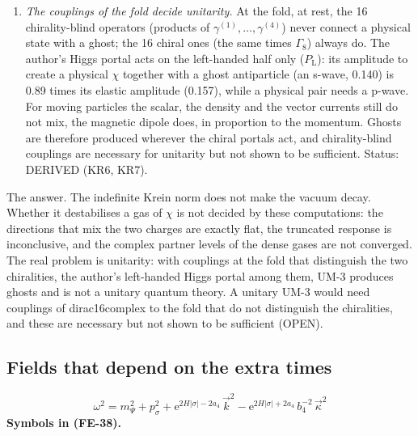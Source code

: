 \documentclass[
  10pt,
]{article}
\begin{document}
\begin{enumerate}
  so whether dense gases of \(\chi\) grow away from their state is not
  established; the dark matter of today is dilute by many orders of
  magnitude. Status: DERIVED (KR5), OPEN (the convergence).
\item
  \emph{The couplings of the fold decide unitarity.} At the fold, at
  rest, the 16 chirality-blind operators (products of
  \(\gamma^{(1)}, \dots, \gamma^{(4)}\)) never connect a physical state
  with a ghost; the 16 chiral ones (the same times \(\Gamma_8\)) always
  do. The author's Higgs portal acts on the left-handed half only
  (\(P_{\mathrm{L}}\)): its amplitude to create a physical \(\chi\)
  together with a ghost antiparticle (an s-wave, 0.140) is 0.89 times
  its elastic amplitude (0.157), while a physical pair needs a p-wave.
  For moving particles the scalar, the density and the vector currents
  still do not mix, the magnetic dipole does, in proportion to the
  momentum. Ghosts are therefore produced wherever the chiral portals
  act, and chirality-blind couplings are necessary for unitarity but not
  shown to be sufficient. Status: DERIVED (KR6, KR7).
\end{enumerate}

The answer. The indefinite Krein norm does not make the vacuum decay.
Whether it destabilises a gas of \(\chi\) is not decided by these
computations: the directions that mix the two charges are exactly flat,
the truncated response is inconclusive, and the complex partner levels
of the dense gases are not converged. The real problem is unitarity:
with couplings at the fold that distinguish the two chiralities, the
author's left-handed Higgs portal among them, UM-3 produces ghosts and
is not a unitary quantum theory. A unitary UM-3 would need couplings of
dirac16complex to the fold that do not distinguish the chiralities, and
these are necessary but not shown to be sufficient (OPEN).

\hypertarget{fields-that-depend-on-the-extra-times}{%
\subsection{Fields that depend on the extra
times}\label{fields-that-depend-on-the-extra-times}}

\[
\omega^2 = m_\Psi^2 + p_\sigma^2 + \mathrm{e}^{2H\lvert\sigma\rvert - 2a_4}\,\vec k^2 - \mathrm{e}^{2H\lvert\sigma\rvert + 2a_4}\,b_4^{-2}\,\vec\kappa^2 \tag{FE-38}
\] \textbf{Symbols in (FE-38).}
\end{document}
